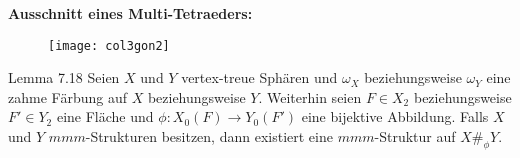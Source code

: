 \documentclass{beamer}
\begin{document}
\begin{frame}

\textbf{Ausschnitt eines Multi-Tetraeders:}
\begin{figure}[H]
\begin{center}
\texttt{[image: col3gon2]}
\end{center}
\end{figure}
\end{frame}
\begin{frame}
\begin{block}{Lemma 7.18}
Seien $X$ und $Y$ vertex-treue Sphären und $\omega_X$ beziehungsweise $\omega_Y$ eine zahme Färbung auf $X$ beziehungsweise $Y.$ Weiterhin seien $F\in X_2$ beziehungsweise $F'\in Y_2$ eine Fläche und $\phi:X_0(F)\to Y_0(F')$ eine bijektive Abbildung. 
Falls $X$ und $Y$ $mmm$-Strukturen besitzen, dann existiert eine $mmm$-Struktur auf $X\#_{\phi}Y$.
\end{block}
\end{frame}
\end{document}
